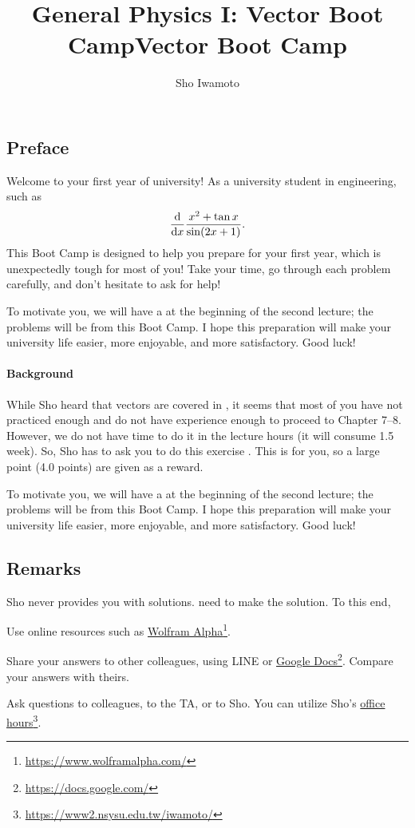 \documentclass[11pt,pdfa,lastpage]{MishoNote}
\title{General Physics I: Vector Boot Camp}
\author{Sho Iwamoto}
\newcommand\hrefFN[2]{\href{#1}{#2}\footnote{\url{#1}}}
\let\origfootnote\footnote
\let\origfootnoterule\footnoterule
\begin{document}
%
\title{Vector Boot Camp}
\begin{maketitle}
\let\footnote\origfootnote
\let\footnoterule\origfootnoterule

\subsection*{Preface}
Welcome to your first year of university!
As a university student in engineering,  such as
\[
\diff{}{x}\frac{x^2+\tan x}{\sin(2x+1)}.
\]
This Boot Camp is designed to help you prepare for your first year, which is unexpectedly tough for most of you!
Take your time, go through each problem carefully, and don't hesitate to ask for help!

To motivate you, we will have a  at the beginning of the second lecture; the problems will be from this Boot Camp.
I hope this preparation will make your university life easier, more enjoyable, and more satisfactory. Good luck!

\paragraph{Background}
While Sho heard that vectors are covered in , it seems that most of you have not practiced enough and do not have experience enough to proceed to Chapter 7--8.
However, we do not have time to do it in the lecture hours (it will consume 1.5 week).
So, Sho has to ask you to do this exercise .
This is  for you, so a large point (4.0 points) are given as a reward.



To motivate you, we will have a  at the beginning of the second lecture; the problems will be from this Boot Camp.
I hope this preparation will make your university life easier, more enjoyable, and more satisfactory. Good luck!

\subsection*{Remarks}
Sho never provides you with solutions.  need to make the solution. To this end,
\begin{miniitemize}
  \item Use online resources such as \hrefFN{https://www.wolframalpha.com/}{Wolfram Alpha}.
  \item Share your answers to other colleagues, using LINE or \hrefFN{https://docs.google.com/}{Google Docs}. Compare your answers with theirs.
  \item Ask questions to colleagues, to the TA, or to Sho. You can utilize Sho's \hrefFN{https://www2.nsysu.edu.tw/iwamoto/}{office hours}.
\end{miniitemize}



\end{maketitle}
\end{document}
